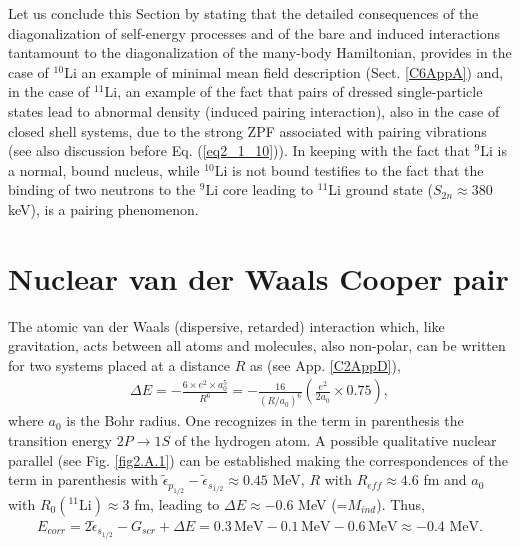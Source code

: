  
 Let us conclude this Section by stating that the detailed consequences  of the diagonalization of self-energy processes and of the bare and induced interactions  tantamount to the diagonalization of the many-body Hamiltonian, provides in the case of $^{10}$Li an example of minimal mean field description  (Sect. \ref{C6AppA}) and, in the case of $^{11}$Li, an example of the fact that pairs of dressed single-particle states lead to abnormal density (induced pairing interaction), also in the case of closed shell systems, due to the strong ZPF associated with pairing vibrations (see also discussion before Eq. (\ref{eq2_1_10})). In keeping with the fact that $^9$Li is a normal, bound nucleus, while $^{10}$Li is not bound testifies to the fact that the binding of two neutrons to the $^9$Li core leading to $^{11}$Li ground state ($S_{2n}\approx 380$ keV), is a pairing phenomenon. 

 \section{Nuclear van der Waals Cooper pair}\label{C2SG2}
 The atomic van der Waals (dispersive, retarded) interaction which, like gravitation,  acts between all atoms and molecules, also non-polar, can be written for two systems placed at a distance $R$ as (see App. \ref{C2AppD}), 
 \begin{align}\label{eq1C2AppG}
 \Delta E=-\frac{6\times e^2 \times a_0^5}{R^6}=-\frac{16}{(R/a_0)^6}\left(\frac{e^2}{2a_0}\times 0.75\right),
 \end{align}
 where $a_0$ is the Bohr radius. One recognizes in the term in parenthesis the transition energy $2P\to1S$ of the hydrogen atom. A possible qualitative nuclear parallel (see Fig. \ref{fig2.A.1})  can be established making the  correspondences  of the term in parenthesis with $\tilde\epsilon_{p_{1/2}}-\tilde\epsilon_{s_{1/2}}\approx0.45$ MeV, $R$ with $R_{eff}\approx4.6$ fm and $a_0$ with $R_0(^{11}\text{Li})\approx3$ fm, leading to $\Delta E\approx-0.6$ MeV (=$M_{ind}$).
  Thus,
 \begin{align*}
E_{corr}=2\tilde{\epsilon}_{s_{1/2}}-G_{scr}+\Delta E=0.3\,\text{MeV}-0.1\,\text{MeV}-0.6\,\text{MeV}\approx -0.4\text{ MeV}.
 \end{align*} 


